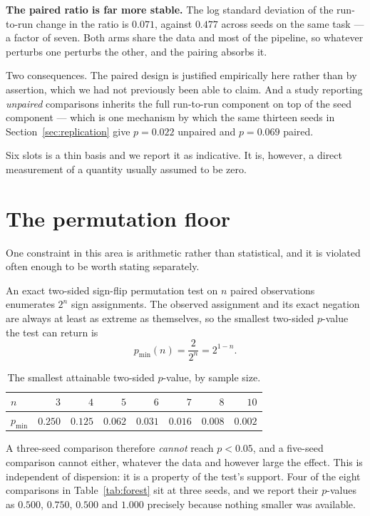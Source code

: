 \documentclass[11pt,onecolumn]{article}
\begin{document}
\textbf{The paired ratio is far more stable.} The log standard deviation
of the run-to-run change in the ratio is $0.071$, against $0.477$ across
seeds on the same task --- a factor of seven. Both arms share the data
and most of the pipeline, so whatever perturbs one perturbs the other,
and the pairing absorbs it.

Two consequences. The paired design is justified empirically here rather
than by assertion, which we had not previously been able to claim. And
a study reporting \emph{unpaired} comparisons inherits the full
run-to-run component on top of the seed component --- which is one
mechanism by which the same thirteen seeds in
Section~\ref{sec:replication} give $p = 0.022$ unpaired and $p = 0.069$
paired.

Six slots is a thin basis and we report it as indicative. It is,
however, a direct measurement of a quantity usually assumed to be zero.

\section{The permutation floor}\label{sec:floor}
One constraint in this area is arithmetic rather than statistical, and
it is violated often enough to be worth stating separately.

An exact two-sided sign-flip permutation test on $n$ paired
observations enumerates $2^n$ sign assignments. The observed assignment
and its exact negation are always at least as extreme as themselves, so
the smallest two-sided $p$-value the test can return is
\begin{equation}
  p_{\min}(n) = \frac{2}{2^{n}} = 2^{1-n}.
\end{equation}

\begin{table}[htb]\centering\small
\caption{The smallest attainable two-sided $p$-value, by sample size.}
\label{tab:floor}
\begin{tabular}{lrrrrrrr}
\toprule
$n$ & $3$ & $4$ & $5$ & $6$ & $7$ & $8$ & $10$ \\
\midrule
$p_{\min}$ & $0.250$ & $0.125$ & $0.062$ & $0.031$ & $0.016$ & $0.008$ & $0.002$ \\
\bottomrule
\end{tabular}
\end{table}

A three-seed comparison therefore \emph{cannot} reach $p < 0.05$, and a
five-seed comparison cannot either, whatever the data and however large
the effect. This is independent of dispersion: it is a property of the
test's support. Four of the eight comparisons in
Table~\ref{tab:forest} sit at three seeds, and we report their
$p$-values as $0.500$, $0.750$, $0.500$ and $1.000$ precisely because
nothing smaller was available.
\end{document}
